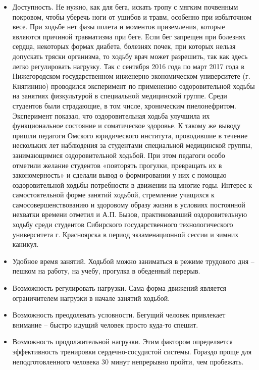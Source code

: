 \documentclass[14pt, a4paper]{article}
\begin{document}
    \begin{itemize}
        \item Доступность. Не нужно, как для бега, искать тропу с мягким почвенным покровом, чтобы уберечь ноги от ушибов и травм, особенно при избыточном весе. При ходьбе нет фазы полета и моментов приземления, которые являются причиной травматизма при беге. Если бег запрещен при болезнях сердца, некоторых формах диабета, болезнях почек, при которых  нельзя допускать тряски организма, то ходьбу врач может разрешить, так как здесь легко регулировать нагрузку. Так с сентября 2016 года по март 2017 года в Нижегородском государственном инженерно-экономическом университете (г. Княгинино)  проводился эксперимент по применению оздоровительной ходьбы на занятиях физкультурой в специальной медицинской группе. Среди студентов были страдающие, в том числе, хроническим пиелонефритом.  Эксперимент показал, что оздоровительная ходьба улучшила их функциональное состояние и соматическое здоровье. К такому же выводу пришли педагоги Омского юридического института, проводившие в течение нескольких лет наблюдения за студентами специальной медицинской группы, занимающимися оздоровительной ходьбой. При этом педагоги особо отметили желание студентов «повторять прогулки, превращать их в закономерность» и сделали вывод о формировании у них с помощью оздоровительной ходьбы потребности в движении на многие годы. Интерес к самостоятельной форме занятий ходьбой, стремление учащихся к самосовершенствованию и здоровому образу жизни в условиях постоянной нехватки времени отметил и А.П. Бызов, практиковавший оздоровительную ходьбу среди студентов Сибирского государственного технологического университета  г. Красноярска в период экзаменационной сессии и зимних каникул.

        \item Удобное время занятий. Ходьбой можно заниматься в режиме трудового  дня – пешком на работу, на учебу, прогулка в обеденный перерыв.
        
        \item Возможность регулировать нагрузки. Сама форма движений является ограничителем нагрузки в начале занятий ходьбой.
        
        \item Возможность преодолевать условности. Бегущий человек привлекает внимание – быстро идущий человек просто куда-то спешит.
        
        \item Возможность продолжительной нагрузки. Этим фактором  определяется эффективность тренировки сердечно-сосудистой системы. Гораздо проще для неподготовленного человека 30 минут непрерывно пройти, чем пробежать.
        

\end{itemize}
\end{document}
